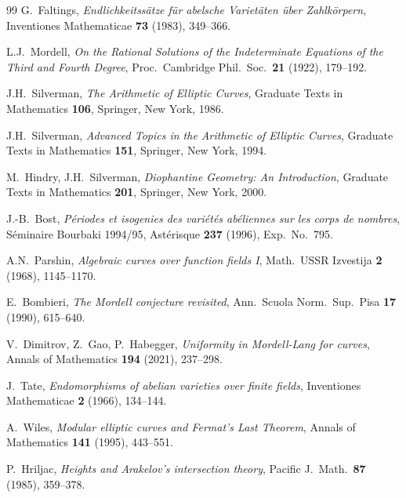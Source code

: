 ﻿\documentclass[12pt,a4paper]{article}
\theoremstyle{plain}
\theoremstyle{definition}
\theoremstyle{remark}
\begin{document}
\begin{thebibliography}{99}
G.\ Faltings,
\textit{Endlichkeitssätze für abelsche Varietäten über Zahlkörpern},
Inventiones Mathematicae \textbf{73} (1983), 349--366.

L.J.\ Mordell,
\textit{On the Rational Solutions of the Indeterminate Equations of the Third and Fourth Degree},
Proc.\ Cambridge Phil.\ Soc.\ \textbf{21} (1922), 179--192.

J.H.\ Silverman,
\textit{The Arithmetic of Elliptic Curves},
Graduate Texts in Mathematics \textbf{106}, Springer, New York, 1986.

J.H.\ Silverman,
\textit{Advanced Topics in the Arithmetic of Elliptic Curves},
Graduate Texts in Mathematics \textbf{151}, Springer, New York, 1994.

M.\ Hindry, J.H.\ Silverman,
\textit{Diophantine Geometry: An Introduction},
Graduate Texts in Mathematics \textbf{201}, Springer, New York, 2000.

J.-B.\ Bost,
\textit{Périodes et isogenies des variétés abéliennes sur les corps de nombres},
Séminaire Bourbaki 1994/95, Astérisque \textbf{237} (1996), Exp.\ No.\ 795.

A.N.\ Parshin,
\textit{Algebraic curves over function fields I},
Math.\ USSR Izvestija \textbf{2} (1968), 1145--1170.

E.\ Bombieri,
\textit{The Mordell conjecture revisited},
Ann.\ Scuola Norm.\ Sup.\ Pisa \textbf{17} (1990), 615--640.

V.\ Dimitrov, Z.\ Gao, P.\ Habegger,
\textit{Uniformity in Mordell-Lang for curves},
Annals of Mathematics \textbf{194} (2021), 237--298.

J.\ Tate,
\textit{Endomorphisms of abelian varieties over finite fields},
Inventiones Mathematicae \textbf{2} (1966), 134--144.

A.\ Wiles,
\textit{Modular elliptic curves and Fermat's Last Theorem},
Annals of Mathematics \textbf{141} (1995), 443--551.

P.\ Hriljac,
\textit{Heights and Arakelov's intersection theory},
Pacific J.\ Math.\ \textbf{87} (1985), 359--378.
\end{thebibliography}
\end{document}

